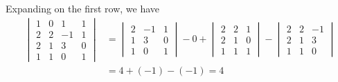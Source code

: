 Expanding on the first row, we have
\begin{align*} 
\begin{vmatrix} 1 & 0 & 1 & 1\\ 2 & 2 &-1 & 1\\2 & 1 & 3 & 0\\1 & 1 & 0  & 1\end{vmatrix} 
&=
\begin{vmatrix} 2 & -1 & 1\\1 & 3 & 0\\1 & 0 & 1 \end{vmatrix} - 0 + 
\begin{vmatrix} 2 & 2 & 1\\ 2 & 1 & 0\\ 1 & 1 & 1\end{vmatrix} - 
\begin{vmatrix} 2 & 2 & -1\\ 2 & 1 & 3 \\ 1 & 1 & 0 \end{vmatrix}\\
%
&= 4 + (-1) - (-1) = 4
\end{align*}
